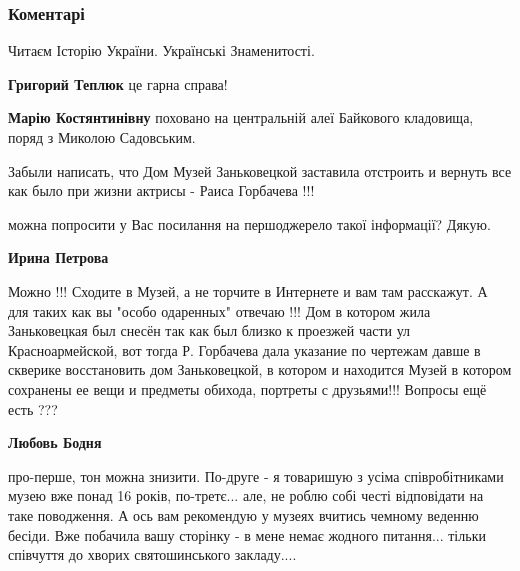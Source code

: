  
 
 
 
 
\subsubsection{Коментарі}
\label{sec:04_08_2020.fb.fb_group.story_kiev_ua.1.166_let_zanjkoveckaja.cmt}

\begin{itemize} %
Читаєм
Історію України. Українські
Знаменитості.

\textbf{Григорий Теплюк} це гарна справа!

\textbf{Марію Костянтинівну} поховано на центральній алеї Байкового кладовища, поряд з Миколою Садовським.


Забыли написать, что Дом Музей Заньковецкой заставила отстроить и вернуть все
как было при жизни актрисы - Раиса Горбачева !!!

\begin{itemize} %
можна попросити у Вас посилання на першоджерело такої інформації? Дякую.

\textbf{Ирина Петрова} 

Можно !!! Сходите в Музей, а не торчите в Интернете и вам там расскажут. А для
таких как вы "особо одаренных" отвечаю !!! Дом в котором жила Заньковецкая был
снесён так как был близко к проезжей части ул Красноармейской, вот тогда Р.
Горбачева дала указание по чертежам давше в скверике восстановить дом
Заньковецкой, в котором и находится Музей в котором сохранены ее вещи и
предметы обихода, портреты с друзьями!!! Вопросы ещё есть ???

\textbf{Любовь Бодня} 

про-перше, тон можна знизити. По-друге - я товаришую з усіма співробітниками
музею вже понад 16 років, по-третє... але, не роблю собі честі відповідати на
таке поводження. А ось вам рекомендую у музеях вчитись чемному веденню бесіди.
Вже побачила вашу сторінку - в мене немає жодного питання... тільки співчуття до
хворих святошинського закладу....


\end{itemize}
\end{itemize}
